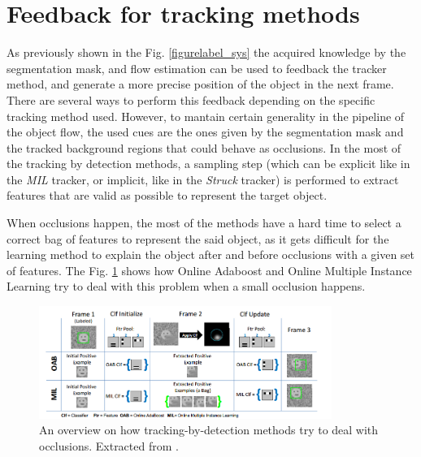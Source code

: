 \section{Feedback for tracking methods} \label{sec:feedback}

As previously shown in the Fig. \ref{figurelabel_sys} the acquired knowledge by the segmentation mask, and flow estimation can be used to 
feedback the tracker method, and generate a more precise position of the object in the next frame. There are several ways to perform this feedback 
depending on the specific tracking method used. However, to mantain certain generality in the pipeline of the object flow, the used cues are the ones 
given by the segmentation mask and the tracked background regions that could behave as occlusions. 
In the most of the tracking by detection methods, a sampling step (which can be explicit like in the {\it MIL} tracker, or implicit, 
like in the {\it Struck} tracker) is performed to extract features that are valid as possible to represent the target object. 
   
When occlusions happen, the most of the methods have a hard time to select a correct bag of features to represent the said object, as it gets difficult 
for the learning method to explain the object after and before occlusions with a given set of features. The Fig. \ref{tr_mil} shows how Online Adaboost 
and Online Multiple Instance Learning try to deal with this problem when a small occlusion happens. 

   \begin{figure}[thpb]
      \centering
      \includegraphics[width=0.85\textwidth]{../images/mil.png}
      \caption{An overview on how tracking-by-detection methods try to deal with occlusions. Extracted from \cite{c25}.}
      \label{tr_mil}
   \end{figure}

